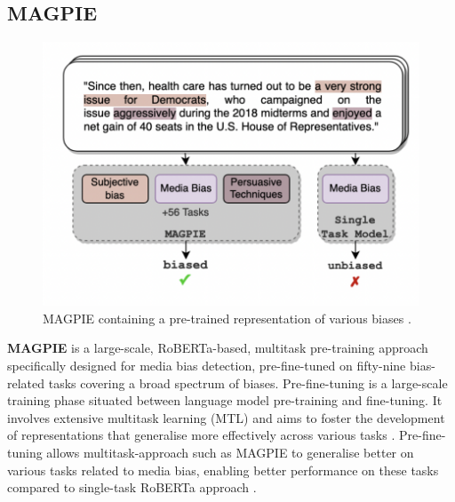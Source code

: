 \subsection{MAGPIE}

\begin{figure}[htbp]
    \centering
    \includegraphics[width=0.8\linewidth]{images/magpie.png}
    \caption{MAGPIE containing a pre-trained representation of various biases \cite{horych-2024-magpie}.}
    \label{fig:magpie}
\end{figure}

\textbf{MAGPIE} \cite{horych-2024-magpie} is a large-scale, RoBERTa-based, multitask pre-training approach specifically designed for media bias detection, pre-fine-tuned on fifty-nine bias-related tasks covering a broad spectrum of biases. Pre-fine-tuning is a large-scale training phase situated between language model pre-training and fine-tuning. It involves extensive multitask learning (MTL) \cite{caruana-1997-mtl} and aims to foster the development of representations that generalise more effectively across various tasks \cite{aghajanyan-2021-muppet}. Pre-fine-tuning allows multitask-approach such as MAGPIE to generalise better on various tasks related to media bias, enabling better performance on these tasks compared to single-task RoBERTa approach \cite{horych-2024-magpie}.

